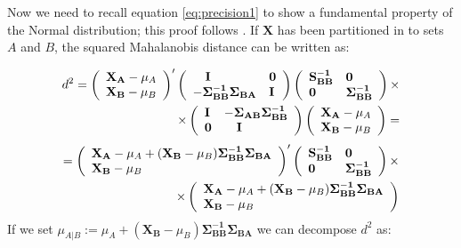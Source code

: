 \documentclass{book}
\begin{document}
Now we need to recall equation \ref{eq:precision1} to show a fundamental property of the Normal distribution; this proof follows \citep[][result 4.6]{JohnsonWichern}.
If $\mathbf{X}$ has been partitioned in to sets $A$ and $B$, the squared Mahalanobis distance can be written as:
 
$$
 \begin{aligned}
	d^2 = 
	\left( \begin{array}{l} 
		\mathbf{X_A} - \mu_A\\
		\mathbf{X_B} - \mu_B
	\end{array} \right)'
	\left( \begin{array}{ll} 
		\quad \mathbf{I} & \mathbf{0}\\ 
		- \mathbf{\Sigma_{BB}^{-1}} \mathbf{\Sigma_{BA}} & \mathbf{I}
	\end{array}
	\right)
	\left( \begin{array}{ll} 
		\mathbf{S_{BB}^{-1}}   & \mathbf{0}\\ 
		\mathbf{0}  & \mathbf{\Sigma_{BB}^{-1}}
	\end{array} \right) \times
	\notag\\ \times
	\left( \begin{array}{ll} 
	\mathbf{I} & - \mathbf{\Sigma_{AB}} \mathbf{\Sigma_{BB}^{-1}}\\ 
	\mathbf{0} & \quad \mathbf{I} \quad
    \end{array} \right)
    \left( \begin{array}{l} 
    	\mathbf{X_A} - \mu_A\\
    	\mathbf{X_B} - \mu_B
    \end{array} \right)	 =
\end{aligned}
$$ 
$$ 
\begin{aligned}=
	\left( \begin{array}{l} 
	\mathbf{X_A} - \mu_A + (\mathbf{X_B} - \mu_B) \mathbf{\Sigma_{BB}^{-1}} \mathbf{\Sigma_{BA}}\\
	\mathbf{X_B} - \mu_B 
\end{array} \right)'
	\left( \begin{array}{ll} 
	\mathbf{S_{BB}^{-1}}   & \mathbf{0}\\ 
	\mathbf{0}  & \mathbf{\Sigma_{BB}^{-1}}
\end{array} \right) \times \\
\notag    \times
	\left( \begin{array}{l} 
	\mathbf{X_A} - \mu_A + (\mathbf{X_B} - \mu_B) \mathbf{\Sigma_{BB}^{-1}} \mathbf{\Sigma_{BA}}\\
	\mathbf{X_B} - \mu_B 
\end{array} \right)
\end{aligned}
$$ If we set $ \mu_{A|B} :=  \mu_A + (\mathbf{X_B} - \mu_B) \mathbf{\Sigma_{BB}^{-1}} \mathbf{\Sigma_{BA}}$
we can decompose $d^2$ as:
\end{document}
